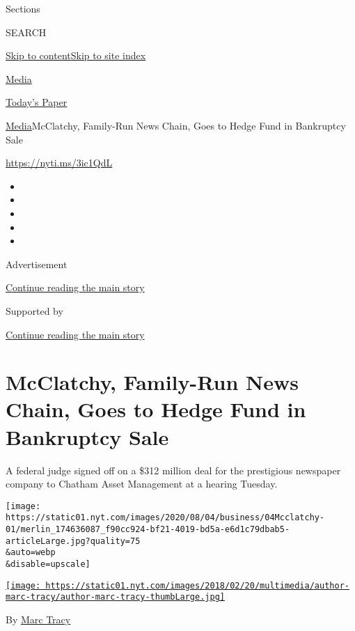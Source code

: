 Sections

SEARCH

\protect\hyperlink{site-content}{Skip to
content}\protect\hyperlink{site-index}{Skip to site index}

\href{https://www.nytimes.com/section/business/media}{Media}

\href{https://myaccount.nytimes.com/auth/login?response_type=cookie\&client_id=vi}{}

\href{https://www.nytimes.com/section/todayspaper}{Today's Paper}

\href{/section/business/media}{Media}\textbar{}McClatchy, Family-Run
News Chain, Goes to Hedge Fund in Bankruptcy Sale

\url{https://nyti.ms/3ic1QdL}

\begin{itemize}
\item
\item
\item
\item
\item
\end{itemize}

Advertisement

\protect\hyperlink{after-top}{Continue reading the main story}

Supported by

\protect\hyperlink{after-sponsor}{Continue reading the main story}

\hypertarget{mcclatchy-family-run-news-chain-goes-to-hedge-fund-in-bankruptcy-sale}{%
\section{McClatchy, Family-Run News Chain, Goes to Hedge Fund in
Bankruptcy
Sale}\label{mcclatchy-family-run-news-chain-goes-to-hedge-fund-in-bankruptcy-sale}}

A federal judge signed off on a \$312 million deal for the prestigious
newspaper company to Chatham Asset Management at a hearing Tuesday.

\texttt{[image: https://static01.nyt.com/images/2020/08/04/business/04Mcclatchy-01/merlin\_174636087\_f90cc924-bf21-4019-bd5a-e6d1c79dbab5-articleLarge.jpg?quality=75\\\&auto=webp\\\&disable=upscale]}

\href{https://www.nytimes.com/by/marc-tracy}{\texttt{[image: https://static01.nyt.com/images/2018/02/20/multimedia/author-marc-tracy/author-marc-tracy-thumbLarge.jpg]}}

By \href{https://www.nytimes.com/by/marc-tracy}{Marc Tracy}

